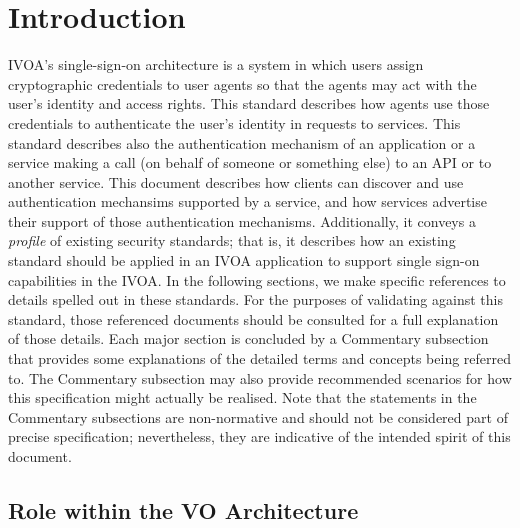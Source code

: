 \documentclass[11pt,a4paper]{ivoa}
\begin{document}
\section{Introduction}
IVOA's single-sign-on architecture is a system in which users assign
cryptographic credentials to user agents so that the agents may act with
the user's identity and access rights. This standard describes how
agents use those credentials to authenticate the user's identity in
requests to services. This standard describes also the authentication
mechanism of an application or a service making a call (on behalf of
someone or something else) to an API or to another service.
This document describes how clients can discover and use authentication
mechansims supported by a service, and how services advertise their
support of those authentication mechanisms. Additionally, it conveys a
{\em profile} of existing security standards; that is, it describes how
an existing standard should be applied in an IVOA application to support
single sign-on capabilities in the IVOA. In the following sections, we
make specific references to details spelled out in these standards. For
the purposes of validating against this standard, those referenced
documents should be consulted for a full explanation of those details.
Each major section is concluded by a Commentary subsection that provides
some explanations of the detailed terms and concepts being referred to.
The Commentary subsection may also provide recommended scenarios for how
this specification might actually be realised. Note that the statements
in the Commentary subsections are non-normative and should not be
considered part of precise specification; nevertheless, they are
indicative of the intended spirit of this document.

\subsection{Role within the VO Architecture}
\end{document}
